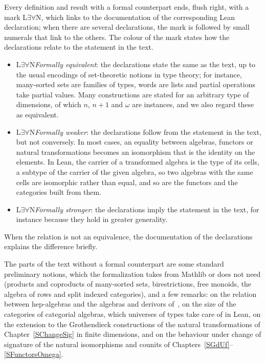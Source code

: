 \documentclass[a4paper, reqno]{amsbook}
\makeatletter
\theoremstyle{plain}
\theoremstyle{definition}
\newcommand*{\CA@leanlogo}{\textsf{L$\exists\forall$N}}
\newcommand*{\leansample}[1]{{\normalfont\footnotesize\color{lean@#1}\CA@leanlogo}}
\makeatother
\begin{document}
Every definition and result with a formal counterpart ends, flush right, with a mark \leansample{equivalent}, which links to the documentation of the corresponding Lean declaration; when there are several declarations, the mark is followed by small numerals that link to the others.
The colour of the mark states how the declarations relate to the statement in the text.
\begin{itemize}
\item \leansample{equivalent}\enspace\emph{Formally equivalent}: the declarations state the same as the text, up to the usual encodings of set-theoretic notions in type theory; for instance, many-sorted sets are families of types, words are lists and partial operations take partial values.
Many constructions are stated for an arbitrary type of dimensions, of which $n$, $n+1$ and $\omega$ are instances, and we also regard these as equivalent.
\item \leansample{weaker}\enspace\emph{Formally weaker}: the declarations follow from the statement in the text, but not conversely.
In most cases, an equality between algebras, functors or natural transformations becomes an isomorphism that is the identity on the elements.
In Lean, the carrier of a transformed algebra is the type of its cells, a subtype of the carrier of the given algebra, so two algebras with the same cells are isomorphic rather than equal, and so are the functors and the categories built from them.
\item \leansample{stronger}\enspace\emph{Formally stronger}: the declarations imply the statement in the text, for instance because they hold in greater generality.
\end{itemize}
When the relation is not an equivalence, the documentation of the declarations explains the difference briefly.

The parts of the text without a formal counterpart are some standard preliminary notions, which the formalization takes from Mathlib or does not need (products and coproducts of many-sorted sets, birestrictions, free monoids, the algebra of rows and split indexed categories), and a few remarks: on the relation between hep-algebras and the algebras and derivors of~\cite{ClimentSoliveres2010b}, on the size of the categories of categorial algebras, which universes of types take care of in Lean, on the extension to the Grothendieck constructions of the natural transformations of Chapter~\ref{SChangeSig} in finite dimensions, and on the behaviour under change of signature of the natural isomorphisms and counits of Chapters~\ref{SGdUf}--\ref{SFunctorsOmega}.
\end{document}
